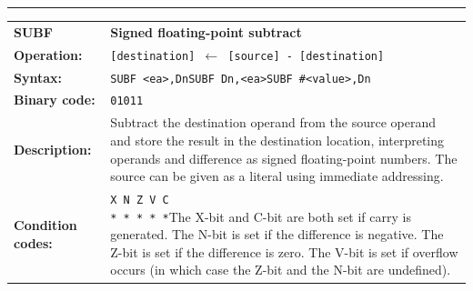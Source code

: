 \documentclass[]{article}
\begin{document}
\begin{appendices}
\noindent\rule{\textwidth}{1pt}\newline %
\setlength\extrarowheight{5pt} %
\begin{tabularx}{\textwidth}{lL}
  {\Large \textbf{SUBF}} 	& {\Large \textbf{Signed floating-point subtract}}\\
  \textbf{Operation:} 		& \texttt{[destination] $\leftarrow$ [source] - [destination]}\\
  \textbf{Syntax:}  		& \texttt{SUBF <ea>,Dn}\newline\texttt{SUBF Dn,<ea>}\newline\texttt{SUBF \#<value>,Dn}\\
  \textbf{Binary code:} 	& \texttt{01011}\\
  \textbf{Description:}  	& Subtract the destination operand from the source operand and store the
result in the destination location, interpreting operands and difference as signed floating-point numbers. The source can be given as a literal using immediate addressing.\\
  \textbf{Condition codes:} & \texttt{X N Z V C\newline * * * * *}\newline\newline The X-bit and C-bit are both set if carry is generated. The N-bit is set if the difference is negative. The Z-bit is set if the difference is zero. The V-bit is set if overflow occurs (in which case the Z-bit and the N-bit are undefined).\\
\end{tabularx}
\newline

\newpage


\end{appendices}
\end{document}
